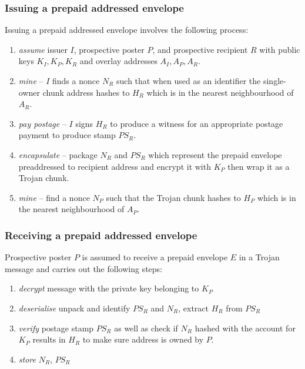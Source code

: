 \subsubsection{Issuing a prepaid addressed envelope}

Issuing a prepaid addressed envelope involves the following process:

\begin{enumerate}
\item \emph{assume} issuer $I$, prospective poster $P$, and prospective recipient $R$ with public keys $K_I, K_P, K_R$ and overlay addresses $A_I, A_P, A_R$.
\item \emph{mine} -- $I$ finds a nonce $N_R$ such that when used as an identifier the single-owner chunk address hashes to $H_R$ which is in the nearest neighbourhood of $A_R$.
\item \emph{pay postage} -- $I$ signs $H_R$ to produce a witness for an appropriate postage payment to produce stamp $PS_R$.
\item \emph{encapsulate} -- package $N_R$ and $PS_R$ which represent the prepaid envelope preaddressed to recipient address and encrypt it with $K_P$ then wrap it as a Trojan chunk.
\item \emph{mine} -- find a nonce $N_P$ such that the Trojan chunk hashes to $H_P$ which is in the nearest neighbourhood of $A_P$. 
\end{enumerate}




\subsubsection{Receiving a prepaid addressed envelope}

Prospective poster $P$ is assumed to receive a prepaid envelope $E$ in a Trojan message and carries out  the following steps:

\begin{enumerate}
    \item \emph{decrypt} message with the private key belonging to $K_P$
    \item \emph{deserialise} unpack and identify $PS_R$ and $N_R$, extract $H_R$ from $PS_R$
    \item \emph{verify} postage stamp $PS_R$ as well as check if $N_R$ hashed with the account for $K_P$ results in $H_R$ to make sure address is owned by $P$.
    \item \emph{store} $N_R$, $PS_R$ 
\end{enumerate}


